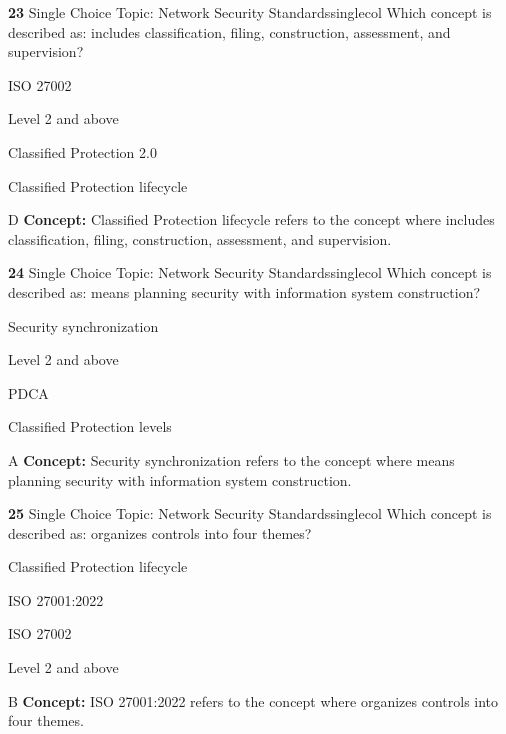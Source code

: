 \documentclass[10pt,a4paper]{article}
\begin{document}
\begin{qcard}{\color{white}\textbf{23} \hfill \small Single Choice \textbar{} Topic: Network Security Standards}{singlecol}
Which concept is described as: includes classification, filing, construction, assessment, and supervision?

\begin{qoptions}
\item ISO 27002
\item Level 2 and above
\item Classified Protection 2.0
\item Classified Protection lifecycle
\end{qoptions}
\begin{explainbox}{D}
\textbf{Concept:} Classified Protection lifecycle refers to the concept where includes classification, filing, construction, assessment, and supervision.
\end{explainbox}
\end{qcard}

\begin{qcard}{\color{white}\textbf{24} \hfill \small Single Choice \textbar{} Topic: Network Security Standards}{singlecol}
Which concept is described as: means planning security with information system construction?

\begin{qoptions}
\item Security synchronization
\item Level 2 and above
\item PDCA
\item Classified Protection levels
\end{qoptions}
\begin{explainbox}{A}
\textbf{Concept:} Security synchronization refers to the concept where means planning security with information system construction.
\end{explainbox}
\end{qcard}

\begin{qcard}{\color{white}\textbf{25} \hfill \small Single Choice \textbar{} Topic: Network Security Standards}{singlecol}
Which concept is described as: organizes controls into four themes?

\begin{qoptions}
\item Classified Protection lifecycle
\item ISO 27001:2022
\item ISO 27002
\item Level 2 and above
\end{qoptions}
\begin{explainbox}{B}
\textbf{Concept:} ISO 27001:2022 refers to the concept where organizes controls into four themes.
\end{explainbox}
\end{qcard}
\end{document}
